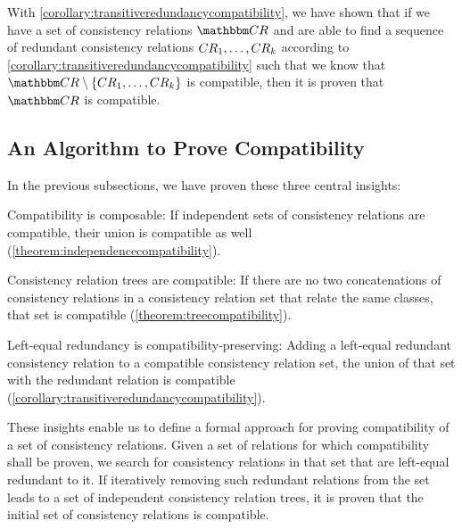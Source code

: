 With \autoref{corollary:transitiveredundancycompatibility}, we have shown that if we have a set of consistency relations $\consistencyrelationset{CR}$ and are able to find a sequence of redundant consistency relations $\consistencyrelation{CR}{1}, \dots, {\consistencyrelation{CR}{k}}$ according to \autoref{corollary:transitiveredundancycompatibility} such that we know that $\consistencyrelationset{CR} \setminus \setted{ \consistencyrelation{CR}{1}, \dots, {\consistencyrelation{CR}{k}}}$ is compatible, then it is proven that $\consistencyrelationset{CR}$ is compatible.



\subsection{An Algorithm to Prove Compatibility} %
\label{chap:compatibility:formal_approach:algorithm}

In the previous subsections, we have proven these three central insights:
\begin{longenumerate}
    \item Compatibility is composable: If independent sets of consistency relations are compatible, their union is compatible as well (\autoref{theorem:independencecompatibility}).
    \item Consistency relation trees are compatible: If there are no two concatenations of consistency relations in a consistency relation set that relate the same classes, that set is compatible (\autoref{theorem:treecompatibility}).
    \item Left-equal redundancy is compatibility-preserving: Adding a left-equal redundant consistency relation to a compatible consistency relation set, the union of that set with the redundant relation is compatible (\autoref{corollary:transitiveredundancycompatibility}).
\end{longenumerate}

These insights enable us to define a formal approach for proving compatibility of a set of consistency relations.
Given a set of relations for which compatibility shall be proven, we search for consistency relations in that set that are left-equal redundant to it.
If iteratively removing such redundant relations from the set leads to a set of independent consistency relation trees, it is proven that the initial set of consistency relations is compatible.

